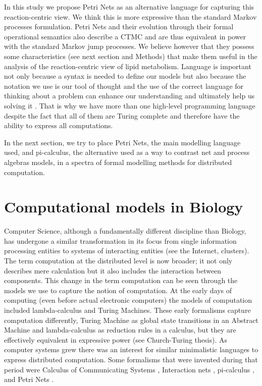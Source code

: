 In this study we propose Petri Nets as an alternative language for capturing this
reaction-centric view. We think this is more expressive than the
standard Markov processes formulation. Petri Nets and their
evolution through their formal operational semantics also describe a
CTMC and are thus equivalent in power with the standard Markov jump
processes. We believe however that they possess some characteristics (see next
section and Methods) that make them useful in the analysis of the
reaction-centric view of lipid metabolism. Language is important not
only because a syntax is needed to define our models but also because
the notation we use is our tool of thought and the use of the correct
language for thinking about a problem can enhance our understanding
and ultimately help us solving it \cite [] {iverson2007notation}. That is why we have more
than one high-level programming language despite the fact that all of
them are Turing complete and therefore have the ability to express all
computations.

In the next section, we try to place Petri Nets, the main modelling
language used, and pi-calculus, the alternative used as a way to
contrast net and process algebras models, in a spectra of formal
modelling methods for distributed computation.

\section{Computational models in Biology}
Computer Science, although a fundamentally different discipline than
Biology, has undergone a similar transformation in its focus from
single information processing entities to systems of interacting
entities (see the Internet, clusters). The term computation at the
distributed level is now broader; it not only describes mere
calculation but it also includes the interaction between
components. This change in the term computation can be seen through
the models we use to capture the notion of computation. At the early
days of computing (even before actual electronic computers) the models
of computation included lambda-calculus and Turing Machines. These
early formalisms capture computation differently, Turing Machine as
global state transitions in an Abstract Machine and lambda-calculus
as reduction rules in a calculus, but they are effectively equivalent
in expressive power (see Church-Turing thesis). As computer systems
grew there was an interest for similar
minimalistic languages to express distributed computation. Some
formalisms that were invented during that period were
Calculus of Communicating Systems \cite [] {milner1980calculus},
Interaction nets \cite [] {lafont1989interaction},
pi-calculus \cite [] {milner1992calculus} , and Petri
Nets \cite [] {murata1989petri}.

